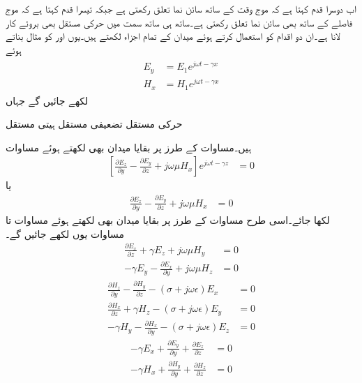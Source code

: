 اب دوسرا قدم کہتا ہے کہ موج وقت کے ساتھ سائن نما تعلق رکھتی ہے جبکہ تیسرا قدم کہتا ہے کہ موج  فاصلے کے ساتھ بھی سائن نما تعلق رکھتی ہے۔ساتھ ہی ساتھ  سمت میں حرکی مستقل بھی بروئے کار لانا ہے۔ان دو اقدام کو استعمال کرتے ہوئے میدان کے تمام اجزاء لکھتے ہیں۔یوں  اور  کو مثال بناتے ہوئے
\begin{gather}
\begin{aligned}\label{مساوات_مویج_سائن_نما_کی_قید}
E_y&=E_1 e^{j \omega t -\gamma x} \\
H_x&=H_1 e^{j \omega t -\gamma x}
\end{aligned}
\end{gather}
لکھے جائیں گے جہاں
\begin{description}
 حرکی مستقل 
 تضعیفی مستقل
 ہیتی مستقل
\end{description}
ہیں۔مساوات  کے طرز پر بقایا میدان بھی لکھتے ہوئے مساوات 
\begin{align*}
\left[\frac{\partial E_z}{\partial y}-\frac{\partial E_y}{\partial z}+j \omega \mu H_x\right] e^{j \omega t -\gamma z}&=0  
\end{align*}
یا
\begin{align}
\frac{\partial E_z}{\partial y}-\frac{\partial E_y}{\partial z}+j \omega \mu H_x&=0  
\end{align}
لکھا جائے۔اسی طرح مساوات  کے طرز پر بقایا میدان بھی لکھتے ہوئے مساوات   تا مساوات  یوں لکھے جائیں گے۔
\begin{align}
\frac{\partial E_x}{\partial z}+\gamma E_z+j \omega \mu H_y&=0  \\
-\gamma E_y-\frac{\partial E_x}{\partial y}+j \omega \mu H_z&=0
\end{align}
%
\begin{align}
\frac{\partial H_z}{\partial y}-\frac{\partial H_y}{\partial z}-(\sigma+j \omega \epsilon)E_x&=0 \\
\frac{\partial H_x}{\partial z}+\gamma H_z-(\sigma+j \omega \epsilon)E_y&=0  \\
-\gamma H_y-\frac{\partial H_x}{\partial y}-(\sigma+j \omega \epsilon)E_z&=0 
\end{align}
%
\begin{align}
-\gamma E_x+\frac{\partial E_y}{\partial y}+\frac{\partial E_z}{\partial z}&=0 \\
-\gamma H_x+\frac{\partial H_y}{\partial y}+\frac{\partial H_z}{\partial z}&=0
\end{align}
